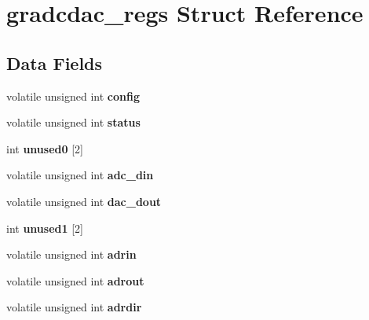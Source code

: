 \hypertarget{structgradcdac__regs}{}\section{gradcdac\+\_\+regs Struct Reference}
\label{structgradcdac__regs}
\subsection*{Data Fields}
\begin{DoxyCompactItemize}
\item 
\mbox{\label{structgradcdac__regs_a80baef834ffc5bf7fda5550cf745b10f}} 
volatile unsigned int {\bfseries config}
\item 
\mbox{\label{structgradcdac__regs_a261c772d620bb09121ecf9bd6b08c801}} 
volatile unsigned int {\bfseries status}
\item 
\mbox{\label{structgradcdac__regs_abdd6537a780a40df7d3f799d7452257e}} 
int {\bfseries unused0} \mbox{[}2\mbox{]}
\item 
\mbox{\label{structgradcdac__regs_a38145a7b2d39d9514c0787907fdf9656}} 
volatile unsigned int {\bfseries adc\+\_\+din}
\item 
\mbox{\label{structgradcdac__regs_a64599e89df6a12ae17c7ad7a2cd66a39}} 
volatile unsigned int {\bfseries dac\+\_\+dout}
\item 
\mbox{\label{structgradcdac__regs_a3030ed3b1dc519d2402fe2b2b0b0847a}} 
int {\bfseries unused1} \mbox{[}2\mbox{]}
\item 
\mbox{\label{structgradcdac__regs_a331f927edadc88f3aa49fd0dfce9a8bc}} 
volatile unsigned int {\bfseries adrin}
\item 
\mbox{\label{structgradcdac__regs_ad712e0701d442f9bfad96bd82d97a22e}} 
volatile unsigned int {\bfseries adrout}
\item 
\mbox{\label{structgradcdac__regs_a80f6ce52e42b0861cb15a34fb33dfb8a}} 
volatile unsigned int {\bfseries adrdir}

\end{DoxyCompactItemize}
